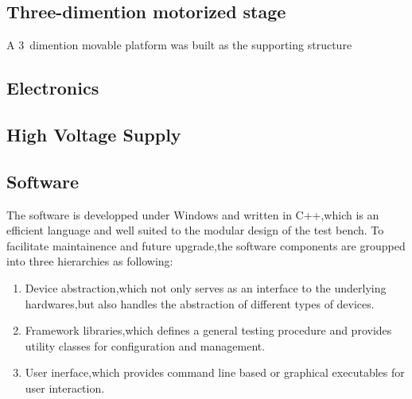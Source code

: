 \documentclass[preprint,5p,times]{elsarticle}
\begin{document}
\subsection{Three-dimention motorized stage}
\label{sec:platform}

A 3~dimention movable platform was built as the supporting structure

\subsection{Electronics}
\label{sec:integrating_sphere}

\subsection{High Voltage Supply}
\label{sec:ref_pmt}

\subsection{Software}
\label{sec:software}
The software is developped under Windows and written in C++,which is an efficient language and well suited to the modular design of the test bench.
To facilitate maintainence and future upgrade,the software components are groupped into three hierarchies as following:
\begin{enumerate}
 \item Device abstraction,which not only serves as an interface to the underlying hardwares,but also handles the abstraction of different types of devices. 
 \item Framework libraries,which defines a general testing procedure and provides utility classes for configuration and management.
 \item User inerface,which provides command line based or graphical executables for user interaction. 
\end{enumerate}
\end{document}
